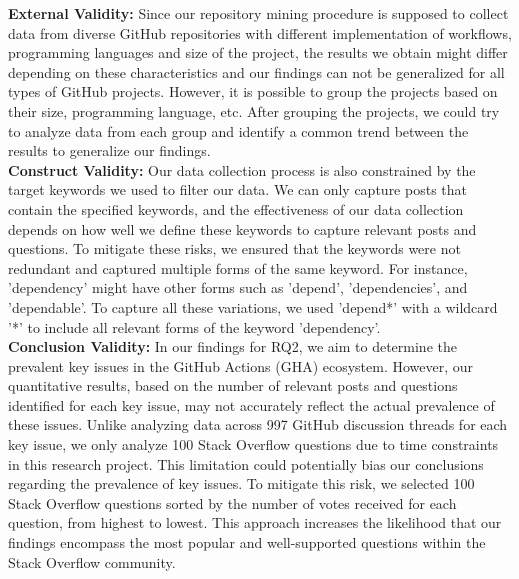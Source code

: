 \documentclass[conference]{IEEEtran}
\begin{document}
        \textbf{External Validity:} Since our repository mining procedure is supposed to collect data from diverse GitHub repositories with different implementation of workflows, programming languages and size of the project, the results we obtain might differ depending on these characteristics and our findings can not be generalized for all types of GitHub projects. However, it is possible to group the projects based on their size, programming language, etc. After grouping the projects, we could try to analyze data from each group and identify a common trend between the results to generalize our findings.\\

	\textbf{Construct Validity:} Our data collection process is also constrained by the target keywords we used to filter our data. We can only capture posts that contain the specified keywords, and the effectiveness of our data collection depends on how well we define these keywords to capture relevant posts and questions. To mitigate these risks, we ensured that the keywords were not redundant and captured multiple forms of the same keyword. For instance, 'dependency' might have other forms such as 'depend', 'dependencies', and 'dependable'. To capture all these variations, we used 'depend*' with a wildcard '*' to include all relevant forms of the keyword 'dependency'.\\

	\textbf{Conclusion Validity:} In our findings for RQ2, we aim to determine the prevalent key issues in the GitHub Actions (GHA) ecosystem. However, our quantitative results, based on the number of relevant posts and questions identified for each key issue, may not accurately reflect the actual prevalence of these issues. Unlike analyzing data across 997 GitHub discussion threads for each key issue, we only analyze 100 Stack Overflow questions due to time constraints in this research project. This limitation could potentially bias our conclusions regarding the prevalence of key issues. To mitigate this risk, we selected 100 Stack Overflow questions sorted by the number of votes received for each question, from highest to lowest. This approach increases the likelihood that our findings encompass the most popular and well-supported questions within the Stack Overflow community.\\
\end{document}

